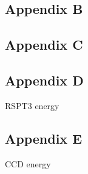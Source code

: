 \documentclass[norsk,a4paper,12pt]{article}
\begin{document}
\subsection*{Appendix B}


\subsection*{Appendix C}


\subsection*{Appendix D}
RSPT3 energy


\subsection*{Appendix E}
CCD energy

\end{document}
